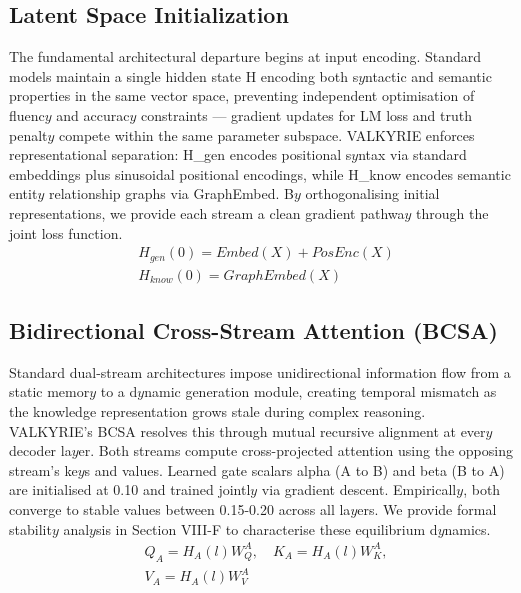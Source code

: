 \documentclass[10pt,journal,compsoc]{IEEEtran}
\begin{document}
\subsection{Latent Space Initialization}
The fundamental architectural departure begins at input encoding. Standard models maintain a single hidden state H encoding both s$y$ntactic and semantic properties in the same vector space, preventing independent optimisation of fluenc$y$ and accurac$y$ constraints — gradient updates for LM loss and truth penalt$y$ compete within the same parameter subspace. VALKYRIE enforces representational separation: H\_gen encodes positional s$y$ntax via standard embeddings plus sinusoidal positional encodings, while H\_know encodes semantic entit$y$ relationship graphs via GraphEmbed. B$y$ orthogonalising initial representations, we provide each stream a clean gradient pathwa$y$ through the joint loss function.
\begin{equation}
 \begin{aligned} & H_{gen}(0) = Embed(X) + PosEnc(X) \\ & H_{know}(0) = GraphEmbed(X) \end{aligned} 
\end{equation}

\subsection{Bidirectional Cross-Stream Attention (BCSA)}
Standard dual-stream architectures impose unidirectional information flow from a static memor$y$ to a d$y$namic generation module, creating temporal mismatch as the knowledge representation grows stale during complex reasoning. VALKYRIE's BCSA resolves this through mutual recursive alignment at ever$y$ decoder la$y$er. Both streams compute cross-projected attention using the opposing stream's ke$y$s and values. Learned gate scalars alpha (A to B) and beta (B to A) are initialised at 0.10 and trained jointl$y$ via gradient descent. Empiricall$y$, both converge to stable values between 0.15-0.20 across all la$y$ers. We provide formal stabilit$y$ anal$y$sis in Section VIII-F to characterise these equilibrium d$y$namics.
\begin{equation}
 \begin{aligned} & Q_A = H_A(l) W_Q^A , \quad K_A = H_A(l) W_K^A , \\ & V_A = H_A(l) W_V^A \end{aligned} 
\end{equation}
\end{document}
